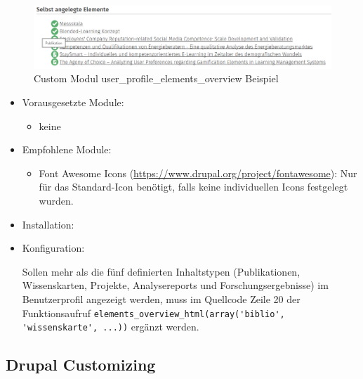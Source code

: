 \begin{figure}[H]
	\centering
	\includegraphics[width=0.80\linewidth]{images/example_userprofile}
	\caption{Custom Modul user\_profile\_elements\_overview Beispiel}
	\label{fig:example_userprofile}
\end{figure}

\begin{itemize}[parsep=0pt, itemsep=5.0pt plus 2.0pt minus 1.0pt, leftmargin=*]
	\item Vorausgesetzte Module:
	\begin{itemize}
		\item keine
	\end{itemize}
	
	\item Empfohlene Module:
	\begin{itemize}
		\item Font Awesome Icons (\url{https://www.drupal.org/project/fontawesome}): Nur für das Standard-Icon benötigt, falls keine individuellen Icons festgelegt wurden.
	\end{itemize}
	
	\item Installation: 
	
	\standardinstall
	
	
	\item Konfiguration:
	
	\noconfig
	
	Sollen mehr als die fünf definierten Inhaltstypen (Publikationen, Wissenskarten, Projekte, Analysereports und Forschungsergebnisse) im Benutzerprofil angezeigt werden, muss im Quellcode Zeile 20 der Funktionsaufruf \lstinline|elements_overview_html(array('biblio', 'wissenskarte', ...))| ergänzt werden.	
\end{itemize}



\newpage
\subsection{Drupal Customizing}\label{sub:drupal_customizing}


